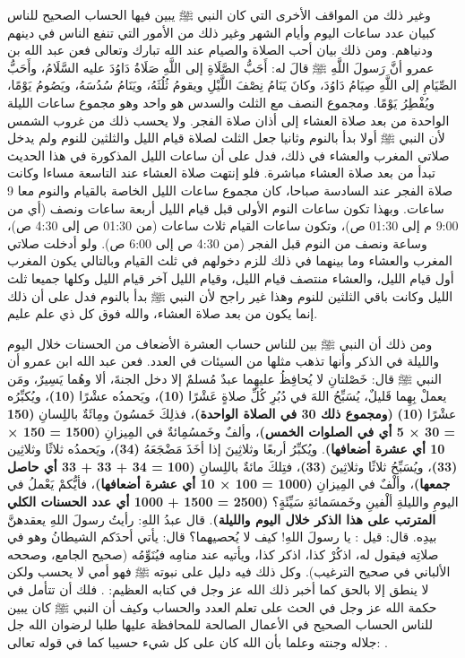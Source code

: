 وغير ذلك من المواقف الأخرى التي كان النبي ﷺ يبين فيها الحساب الصحيح للناس كبيان عدد ساعات اليوم وأيام الشهر وغير ذلك من الأمور التي تنفع الناس في دينهم ودنياهم. ومن ذلك بيان أحب الصلاة والصيام عند الله تبارك وتعالى فعن عبد الله بن عمرو أنَّ رَسولَ اللَّهِ ﷺ قالَ له: أَحَبُّ الصَّلَاةِ إلى اللَّهِ صَلَاةُ دَاوُدَ عليه السَّلَامُ، وأَحَبُّ الصِّيَامِ إلى اللَّهِ صِيَامُ دَاوُدَ، وكانَ يَنَامُ نِصْفَ اللَّيْلِ ويقومُ ثُلُثَهُ، ويَنَامُ سُدُسَهُ، ويَصُومُ يَوْمًا، ويُفْطِرُ يَوْمًا. ومجموع النصف مع الثلث والسدس هو واحد وهو مجموع ساعات الليلة الواحدة من بعد صلاة العشاء إلى أذان صلاة الفجر. ولا يحسب ذلك من غروب الشمس لأن النبي ﷺ أولا بدأ بالنوم وثانيا جعل الثلث لصلاة قيام الليل والثلثين للنوم ولم يدخل صلاتي المغرب والعشاء في ذلك، فدل على أن ساعات الليل المذكورة في هذا الحديث تبدأ من بعد صلاة العشاء مباشرة. فلو إنتهت صلاة العشاء عند التاسعة مساءا وكانت صلاة الفجر عند السادسة صباحا، كان مجموع ساعات الليل الخاصة بالقيام والنوم معا 9 ساعات. وبهذا تكون ساعات النوم الأولى قبل قيام الليل أربعة ساعات ونصف (أي من 9:00 م إلى 01:30 ص)، وتكون ساعات القيام ثلاث ساعات (من 01:30 ص إلى 4:30 ص)، وساعة ونصف من النوم قبل الفجر (من 4:30 ص إلى 6:00 ص). ولو أدخلت صلاتي المغرب والعشاء وما بينهما في ذلك للزم دخولهم في ثلث القيام وبالتالي يكون المغرب أول قيام الليل، والعشاء منتصف قيام الليل، وقيام الليل آخر قيام الليل وكلها جميعا ثلث الليل وكانت باقي الثلثين للنوم وهذا غير راجح لأن النبي ﷺ بدأ بالنوم فدل على أن ذلك إنما يكون من بعد صلاة العشاء، والله فوق كل ذي علم عليم.

ومن ذلك أن النبي ﷺ بين للناس حساب العشرة الأضعاف من الحسنات خلال اليوم والليلة في الذكر وأنها تذهب مثلها من السيئات في العدد. فعن عبد الله ابن عمرو أن النبي ﷺ قال: خَصْلتانِ لا يُحافِظُ عليهِما عبدٌ مُسلمٌ إلا دخل الجنةَ، ألا وهُما يَسِيرٌ، ومَن يعملْ بِهِما قَليلٌ، يُسَبِّحُ اللهَ في دُبُرِ كُلِّ صلاةٍ عَشْرًا \textbf{\small(10)}، ويَحمدُه عشْرًا \textbf{\small(10)}، ويُكبِّرُه عشْرًا \textbf{\small(10)} \textbf{\small(ومجموع ذلك 30 في الصلاة الواحدة)}، فذلِكَ خَمسُونَ ومِائَةٌ باللِسانِ \textbf{\small(150 = 30 × 5 أي في الصلوات الخمس)}، وألفٌ وخَمسُمِائةٌ في المِيزانِ \textbf{\small(1500 = 150 × 10 أي عشرة أضعافها)}. ويُكبِّرُ أربعًا وثلاثِينَ إذا أخَذَ مَضْجَعَهُ \textbf{\small(34)}، ويَحمدُه ثلاثًا وثلاثِين \textbf{\small(33)}، ويُسَبِّحُ ثلاثًا وثلاثِينَ \textbf{\small(33)}، فتِلكَ مائةٌ باللِسانِ \textbf{\small(100 = 34 + 33 + 33 أي حاصل جمعها)}، وألْفٌ في المِيزانِ \textbf{\small(1000 = 100 × 10 أي عشرة أضعافها)}، فأيُّكمْ يَعْملُ في اليومِ والليلةِ ألْفينِ وخَمسَمائةِ سَيِّئَةٍ؟ \textbf{\small(2500 = 1500 + 1000 أي عدد الحسنات الكلي المترتب على هذا الذكر خلال اليوم والليلة)}. قال عبدُ اللهِ: رأيتُ رسولَ اللهِ يعقدهنَّ بيدِه. قال: قيل : يا رسولَ اللهِ! كيف لا يُحصيهما؟ قال: يأتي أحدَكم الشيطانُ وهو في صلاتِه فيقول له، اذكُرْ كذا، اذكر كذا، ويأتيه عند منامِه فيُنَوِّمُه {\footnotesize (صحيح الجامع، وصححه الألباني في صحيح الترغيب)}. وكل ذلك فيه دليل على نبوته ﷺ فهو أمي لا يحسب ولكن لا ينطق إلا بالحق كما أخبر ذلك الله عز وجل في كتابه العظيم:
\quranayah*[53][3-4]{\footnotesize \surahname*[53]}. فلك أن تتأمل في حكمة الله عز وجل في الحث على تعلم العدد والحساب وكيف أن النبي ﷺ كان يبين للناس الحساب الصحيح في الأعمال الصالحة للمحافظة عليها طلبا لرضوان الله جل جلاله وجنته وعلما بأن الله كان على كل شيء حسيبا كما في قوله تعالى: \quranayah*[4][86-87]{\footnotesize \surahname*[4]}.


